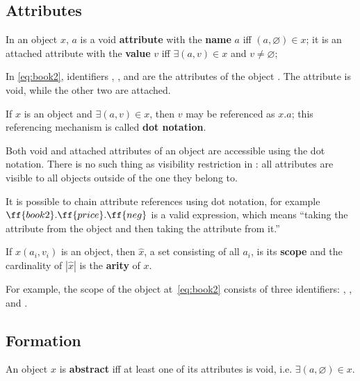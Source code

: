 \subsection{Attributes}

\begin{definition}\label{def:attribute}
In an object \(x\), \(a\) is a void \textbf{attribute}
with the \textbf{name} \(a\)
iff \((a, \varnothing) \in x\); it is an attached attribute
with the \textbf{value} \(v\)
iff \(\exists (a, v)\in x\) and \(v\not=\varnothing\);
\end{definition}

In \cref{eq:book2}, identifiers , , and 
are the attributes of the object .
The attribute  is void, while the other two are attached.

\begin{definition}\label{def:dot}
If \(x\) is an object and \(\exists (a, v) \in x\), then \(v\) may be referenced as \(x.a\);
this referencing mechanism is called \textbf{dot notation}.
\end{definition}

Both void and attached attributes of an object are accessible using
the dot notation. There is no such thing as
visibility restriction in \phic{}:
all attributes are visible to all objects outside of the one they belong to.

It is possible to chain attribute references using dot notation, for example
\(\ff{book2}.\ff{price}.\ff{neg}\) is a valid expression, which means
``taking the attribute  from the object  and then
taking the attribute  from it.''

\begin{definition}\label{def:scope}
If \(x(a_i, v_i)\) is an object, then \(\hat{x}\), a set consisting of all \(a_i\),
is its \textbf{scope} and the cardinality of \(|\hat{x}|\) is
the \textbf{arity} of \(x\).
\end{definition}

For example, the scope of the object at~\cref{eq:book2} consists of three identifiers:
, , and .

\subsection{Formation}

\begin{definition}\label{def:abstraction}
An object \(x\) is \textbf{abstract} iff at least one of its attributes is void,
i.e. \(\exists (a, \varnothing)\in x\).
\end{definition}

